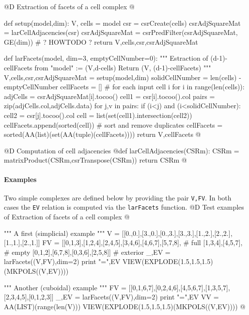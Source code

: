 \documentclass[11pt,oneside]{article}	%
\begin{document}
@D Extraction of facets of a cell complex
@{def setup(model,dim):
	V, cells = model
	csr = csrCreate(cells)
	csrAdjSquareMat = larCellAdjacencies(csr)
	csrAdjSquareMat = csrPredFilter(csrAdjSquareMat, GE(dim)) # ? HOWTODO ?
	return V,cells,csr,csrAdjSquareMat

def larFacets(model, dim=3, emptyCellNumber=0):
	""" Estraction of (d-1)-cellFacets from "model" := (V,d-cells)
		Return (V, (d-1)-cellFacets)
		"""
	V,cells,csr,csrAdjSquareMat = setup(model,dim)
	solidCellNumber = len(cells) - emptyCellNumber
	cellFacets = []
	# for each input cell i
	for i in range(len(cells)):
		adjCells = csrAdjSquareMat[i].tocoo()
		cell1 = csr[i].tocoo().col
		pairs = zip(adjCells.col,adjCells.data)
		for j,v in pairs:
			if (i<j) and (i<solidCellNumber):
				cell2 = csr[j].tocoo().col
				cell = list(set(cell1).intersection(cell2))
				cellFacets.append(sorted(cell))
	# sort and remove duplicates
	cellFacets = sorted(AA(list)(set(AA(tuple)(cellFacets))))
	return V,cellFacets
@}



@D Computation of cell adjacencies
@{def larCellAdjacencies(CSRm):
	CSRm = matrixProduct(CSRm,csrTranspose(CSRm))
	return CSRm
@}

\paragraph{Examples}
Two simple complexes are defined below by providing the pair \texttt{V,FV}.
In both cases the \texttt{EV} relation is computed via the \texttt{larFacets} function.
@D Test examples of Extraction of facets of a cell complex
@{""" A first (simplicial) example """
V = [[0.,0.],[3.,0.],[0.,3.],[3.,3.],[1.,2.],[2.,2.],[1.,1.],[2.,1.]]
FV = [[0,1,3],[1,2,4],[2,4,5],[3,4,6],[4,6,7],[5,7,8], # full
	[1,3,4],[4,5,7], # empty
	[0,1,2],[6,7,8],[0,3,6],[2,5,8]] # exterior		
_,EV = larFacets((V,FV),dim=2)
print "\nEV =",EV
VIEW(EXPLODE(1.5,1.5,1.5)(MKPOLS((V,EV))))

""" Another (cuboidal) example """
FV = [[0,1,6,7],[0,2,4,6],[4,5,6,7],[1,3,5,7],[2,3,4,5],[0,1,2,3]]
_,EV = larFacets((V,FV),dim=2)
print "\nEV =",EV
VV = AA(LIST)(range(len(V)))
VIEW(EXPLODE(1.5,1.5,1.5)(MKPOLS((V,EV))))
@}
\end{document}
